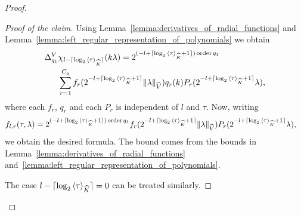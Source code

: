 \begin{proof}
\begin{description}
\begin{proof}[Proof of the claim]
                Using Lemma~\ref{lemma:derivatives_of_radial_functions} and Lemma~\ref{lemma:left_regular_representation_of_polynomials}
                we obtain
                \begin{align*}
                    \DifferenceOperator[\VectorSpace]{q_1} &\chi_{l - \Ceiling{\log_2 \JapaneseBracket{\CompactGroup}{\tau}}}(k \lambda) =
                    2^{(-l + \Ceiling{\log_2 \JapaneseBracket{\CompactGroup}{\tau} + 1}) \order{q_1}}\\
                    &\sum_{r = 1}^{C_q} f_r(2^{-l + \Ceiling{\log_2 \JapaneseBracket{\CompactGroup}{\tau} + 1}} \norm[\dualGroup{\VectorSpace}]{\lambda}) q_r(k) P_r(2^{-l + \Ceiling{\log_2 \JapaneseBracket{\CompactGroup}{\tau} + 1}} \lambda),
                \end{align*}
                where each $f_r$, $q_r$ and each $P_r$ is independent of $l$ and $\tau$.
                Now, writing
                \begin{align*}
                    f_{l, r}(\tau, \lambda) &=
                    2^{(-l + \Ceiling{\log_2 \JapaneseBracket{\CompactGroup}{\tau} + 1}) \order{q_1}}
                    f_r(2^{-l + \Ceiling{\log_2 \JapaneseBracket{\CompactGroup}{\tau} + 1}} \norm[\dualGroup{\VectorSpace}]{\lambda}) P_r(2^{-l + \Ceiling{\log_2 \JapaneseBracket{\CompactGroup}{\tau} + 1}} \lambda),
                \end{align*}
                we obtain the desired formula.
                The bound comes from the bounds in Lemma~\ref{lemma:derivatives_of_radial_functions} and~\ref{lemma:left_regular_representation_of_polynomials}.

                The case $l - \Ceiling{\log_2 \JapaneseBracket{\CompactGroup}{\tau}} = 0$ can be treated similarly.
            \end{proof}


\end{description}
\end{proof}
